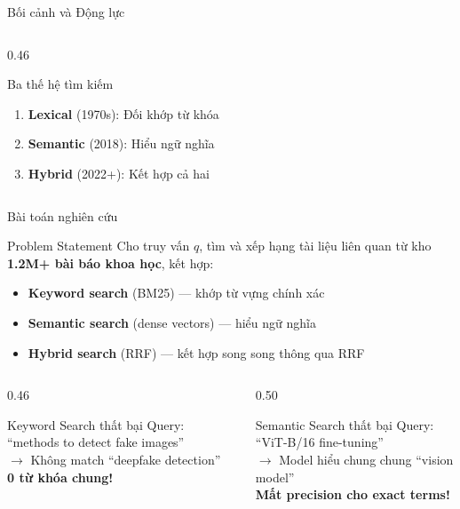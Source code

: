 \begin{frame}{Bối cảnh và Động lực}
\begin{columns}[T]
\begin{column}{0.46\textwidth}
\begin{block}{Ba thế hệ tìm kiếm}
{\footnotesize
\begin{enumerate}\itemsep0pt \parskip0pt 
    \item \textcolor{accentBlue}{\textbf{Lexical}} (1970s): Đối khớp từ khóa
    \item \textcolor{accentOrange}{\textbf{Semantic}} (2018): Hiểu ngữ nghĩa
    \item[\textcolor{accentTeal}{$\star$}] \textcolor{accentTeal}{\textbf{Hybrid}} (2022+): Kết hợp cả hai
\end{enumerate}
}
\end{block}

\end{column}
\end{columns}
\end{frame}

\begin{frame}{Bài toán nghiên cứu}
\begin{block}{Problem Statement}
{\small Cho truy vấn $q$, tìm và xếp hạng tài liệu liên quan từ kho \textbf{1.2M+ bài báo khoa học}, kết hợp:}
\begin{itemize}\itemsep0pt \parskip0pt 
    \item \textcolor{accentBlue}{\textbf{Keyword search}} (BM25) --- khớp từ vựng chính xác
    \item \textcolor{accentOrange}{\textbf{Semantic search}} (dense vectors) --- hiểu ngữ nghĩa
    \item \textcolor{accentTeal}{\textbf{Hybrid search}} (RRF) --- kết hợp song song thông qua RRF
\end{itemize}
\end{block}

\vspace{0.1cm}

\begin{columns}[T]
\begin{column}{0.46\textwidth}
\begin{alertblock}{Keyword Search thất bại}
{\footnotesize
Query: ``methods to detect fake images''\\
$\to$ Không match ``deepfake detection''\\
\textbf{0 từ khóa chung!}
}
\end{alertblock}
\end{column}
\begin{column}{0.50\textwidth}
\begin{alertblock}{Semantic Search thất bại}
{\footnotesize
Query: ``ViT-B/16 fine-tuning''\\
$\to$ Model hiểu chung chung ``vision model''\\
\textbf{Mất precision cho exact terms!}
}
\end{alertblock}
\end{column}
\end{columns}
\end{frame}

